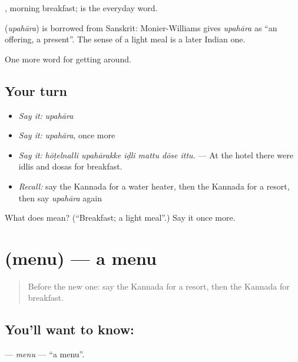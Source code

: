 , morning breakfast;  is the everyday word.

\begin{cousinweb}
\textbf{} (\emph{upahāra}) is borrowed from Sanskrit: Monier-Williams gives \emph{upahāra} as \textquotedblleft{}an offering, a present\textquotedblright{}. The sense of a light meal is a later Indian one.
\end{cousinweb}

\begin{grammarlens}[title={What you've built}]
One more word for getting around.
\end{grammarlens}

\subsection*{Your turn}
\begin{itemize}
\raggedright
  \item \emph{Say it:} \emph{upahāra}
  \item \emph{Say it:} \emph{upahāra}, once more
  \item \emph{Say it:} \emph{hōṭelnalli upahārakke iḍli mattu dōse ittu.} — At the hotel there were idlis and dosas for breakfast.
  \item \emph{Recall:} say the Kannada for a water heater, then the Kannada for a resort, then say \emph{upahāra} again
\end{itemize}

\begin{tcolorbox}[breakable,colback=teal!4,colframe=teal!35!black,title={Before you move on}]
What does  mean? (\textquotedblleft{}Breakfast; a light meal\textquotedblright{}.) Say it once more.
\end{tcolorbox}
\section[\texorpdfstring{\kn{ಮೆನು} (menu)}{ಮೆನು (menu)}]{ (menu) — a menu}

\label{lesson:KA-C464-menu}



\begin{quote}
Before the new one: say the Kannada for a resort, then the Kannada for breakfast.
\end{quote}

\subsection*{You'll want to know: }
\textbf{} — \emph{menu} — \textquotedblleft{}a menu\textquotedblright{}.

